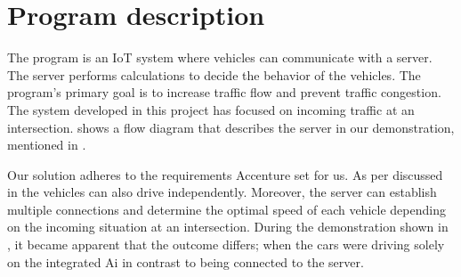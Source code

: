\chapter{Program description}
The program is an IoT system where vehicles can communicate with a server. The server performs calculations to decide the behavior of the vehicles. The program's primary goal is to increase traffic flow and prevent traffic congestion. The system developed in this project has focused on incoming traffic at an intersection.  shows a flow diagram that describes the server in our demonstration, mentioned in .

Our solution adheres to the requirements Accenture set for us. As per discussed in  the vehicles can also drive independently. Moreover, the server can establish multiple connections and determine the optimal speed of each vehicle depending on the incoming situation at an intersection. During the demonstration shown in , it became apparent that the outcome differs; when the cars were driving solely on the integrated Ai in contrast to being connected to the server.

